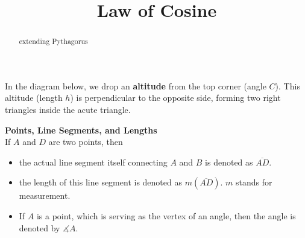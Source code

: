 \documentclass{ximera}
\title{Law of Cosine}
\begin{document}
\begin{abstract}
extending Pythagorus
\end{abstract}
\maketitle







In the diagram below, we drop an \textbf{altitude} from the top corner (angle $C$). This altitude (length $h$) is perpendicular to the opposite side, forming two right triangles inside the acute triangle. \\




\begin{image}[3in]
  \end{image}




\begin{notation} \textbf{\textcolor{purple!85!blue}{Points, Line Segments, and Lengths}}  \\

If $A$ and $D$ are two points, then 

\begin{itemize}
\item the actual line segment itself connecting $A$ and $B$ is denoted as $\overline{AD}$. 
\item the length of this line segment is denoted as $m(\overline{AD})$.  $m$ stands for measurement.
\item If $A$ is a point, which is serving as the vertex of an angle, then the angle is denoted by $\measuredangle A$.
\end{itemize}
\end{notation}
\end{document}
